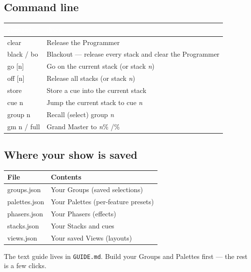 \documentclass[11pt]{article}
\newcommand{\hd}[1]{\textbf{\textcolor{white}{#1}}}
\begin{document}
\subsection{Command line}
\begin{center}\small
{}
\begin{tabularx}{\linewidth}{>{\ttfamily}l Y}
\toprule
{}\hd{\texttt{command}} & \hd{does}\\
\midrule
clear            & Release the Programmer\\
black / bo       & Blackout --- release every stack and clear the Programmer\\
go \textnormal{[n]}   & Go on the current stack (or stack \emph{n})\\
off \textnormal{[n]}  & Release all stacks (or stack \emph{n})\\
store            & Store a cue into the current stack\\
cue n            & Jump the current stack to cue \emph{n}\\
group n          & Recall (select) group \emph{n}\\
gm n \;/\; full  & Grand Master to \emph{n}\% \;/\%\\
\bottomrule
\end{tabularx}
\end{center}

\subsection{Where your show is saved}
\begin{center}\small
\begin{tabularx}{\linewidth}{>{\ttfamily}l Y}
\toprule
\textnormal{\textbf{File}} & \textbf{Contents}\\
\midrule
groups.json   & Your Groups (saved selections)\\
palettes.json & Your Palettes (per-feature presets)\\
phasers.json  & Your Phasers (effects)\\
stacks.json   & Your Stacks and cues\\
views.json    & Your saved Views (layouts)\\
\bottomrule
\end{tabularx}
\end{center}

\vfill
\begin{center}\small\color{cgray}
The text guide lives in \texttt{GUIDE.md}. Build your Groups and Palettes first --- the rest is a few clicks.
\end{center}
\end{document}
